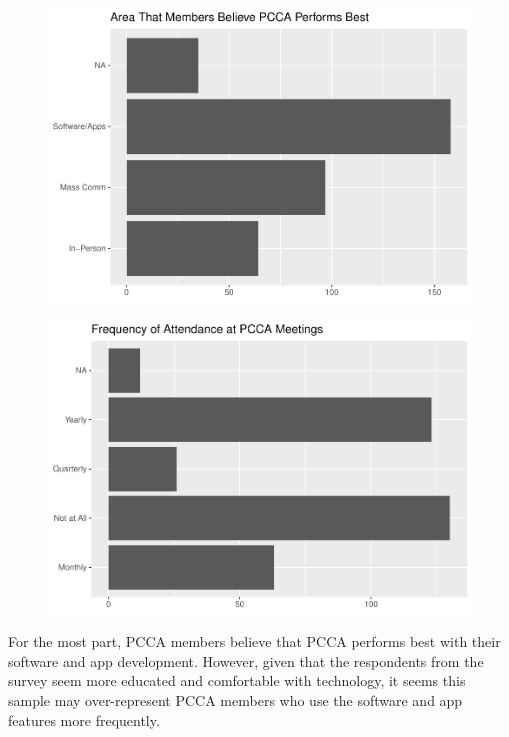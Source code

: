 \documentclass[a4paper]{article}
\begin{document}
\begin{minipage}{0.5\textwidth}
	\begin{figure}[H]
		\centering\includegraphics[scale=0.45]{survey/pcca_survey_files/figure-latex/best-all-1.pdf}
	\end{figure}
\end{minipage}%
\begin{minipage}{0.5\textwidth}
	\begin{figure}[H]
		\includegraphics[scale=0.45]{survey/pcca_survey_files/figure-latex/meetings-all-1.pdf}
	\end{figure}
\end{minipage}

For the most part, PCCA members believe that PCCA performs best with their software and app development. However, given that the respondents from the survey seem more educated and comfortable with technology, it seems this sample may over-represent PCCA members who use the software and app features more frequently.
\end{document}
